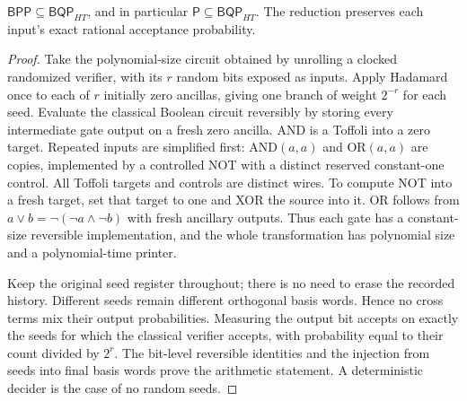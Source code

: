 \begin{theorem}\label{thm:Q02}
$\mathsf{BPP}\subseteq\mathsf{BQP}_{HT}$, and in particular $\mathsf P\subseteq\mathsf{BQP}_{HT}$. The reduction preserves each input's exact rational acceptance probability.
\end{theorem}
\begin{proof}
Take the polynomial-size circuit obtained by unrolling a clocked randomized verifier, with its $r$ random bits exposed as inputs. Apply Hadamard once to each of $r$ initially zero ancillas, giving one branch of weight $2^{-r}$ for each seed. Evaluate the classical Boolean circuit reversibly by storing every intermediate gate output on a fresh zero ancilla. AND is a Toffoli into a zero target. Repeated inputs are simplified first: AND$(a,a)$ and OR$(a,a)$ are copies, implemented by a controlled NOT with a distinct reserved constant-one control. All Toffoli targets and controls are distinct wires. To compute NOT into a fresh target, set that target to one and XOR the source into it. OR follows from $a\lor b=\neg(\neg a\land\neg b)$ with fresh ancillary outputs. Thus each gate has a constant-size reversible implementation, and the whole transformation has polynomial size and a polynomial-time printer.

Keep the original seed register throughout; there is no need to erase the recorded history. Different seeds remain different orthogonal basis words. Hence no cross terms mix their output probabilities. Measuring the output bit accepts on exactly the seeds for which the classical verifier accepts, with probability equal to their count divided by $2^r$. The bit-level reversible identities and the injection from seeds into final basis words prove the arithmetic statement. A deterministic decider is the case of no random seeds.
\end{proof}

